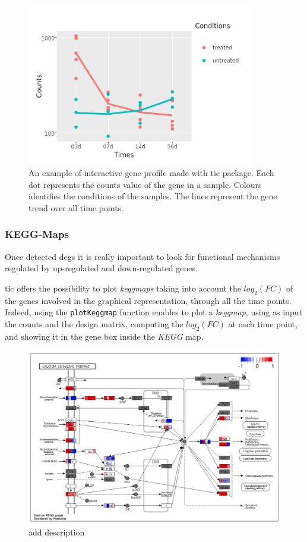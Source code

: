 \begin{figure}[H]
\centering
\includegraphics[width=10cm, keepaspectratio]{img/ticorser/gene_trend.png}
\caption[ticorser gene profile]{An example of interactive gene profile made with \gls{tic} package. Each dot represents the counts value of the gene in a sample. Colours identifies the conditions of the samples. The lines represent the gene trend over all time points.}
\label{fig:ticorsergenetrend}
\end{figure}


\subsubsection{KEGG-Maps}
Once detected \glspl{deg} it is really important to look for functional mechanisms regulated by up-regulated and down-regulated genes. 

\gls{tic} offers the possibility to plot \textit{keggmaps}\cite{Kanehisa2016} taking into account the $log_2(FC)$ of the genes involved in the graphical representation, through all the time points.
Indeed, using the \lstinline!plotKeggmap! function enables to plot a \textit{keggmap}, using as input the counts and the design matrix, computing the $log_2(FC)$ at each time point, and showing it in the gene box inside the \textit{KEGG} map.

\begin{figure}[H]
\includegraphics[width=12cm, keepaspectratio]{img/ticorser/keggmap_example.png}
\caption[ticorser keggmap]{add description}
\label{fig:ticorserkeggmap}
\centering
\end{figure}








